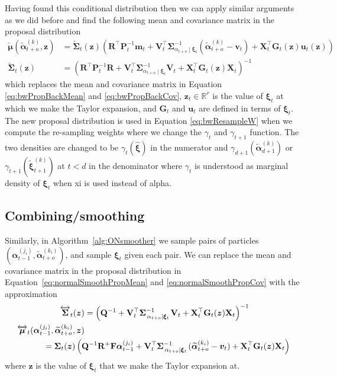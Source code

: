 \documentclass[notitlepage]{article}
\renewcommand{\vec}[1]{\bm{#1}}
\newcommand{\vecLarrow}[1]{\overleftarrow{\vec{#1}}}
\newcommand{\vecLRarrow}[1]{\overleftrightarrow{\vec{#1}}}
\newcommand{\mat}[1]{\mathbf{#1}}
\newcommand{\matLarrow}[1]{\overleftarrow{\mat{#1}}}
\newcommand{\matLRarrow}[1]{\overleftrightarrow{\mat{#1}}}
\newcommand{\Lparen}[1]{\left( #1\right)}
\newcommand\subCond[3]{#1_{\left. #2 \middle\vert #3\right.}}
\newcommand{\partic}[3]{#1_{#2}^{\Lparen{#3}}}
\newcommand{\particB}[3]{\widetilde{#1}_{#2}^{\Lparen{#3}}}
\newcommand{\dimRng}{r}
\newcommand{\nPeriods}{d}
\begin{document}
Having found this conditional distribution then we can apply similar arguments as we did 
before and find the following mean and covariance matrix in the proposal distribution %
%
\begin{align*}
\vecLarrow\mu (\particB{\vec{\alpha}}{t + o}k, \vec z)
	&= \matLarrow\Sigma_t(\vec z)\Lparen{
	\mat R^\top\mat P_t^{-1}\vec m_t + 
	\mat V_t^\top\subCond{\mat\Sigma}{\alpha_{t + o}}{\vec\xi_t}^{-1}
	(\particB{\vec{\alpha}}{t + o}k - \vec v_t) + 
	\mat X_t^\top\mat G_t(\vec z)\vec u_t(\vec z)} \\
\matLarrow\Sigma_t(\vec z) &= 
	\Lparen{
		\mat R^\top\mat P_t^{-1} \mat R + 
		\mat V_t^\top\subCond{\mat\Sigma}{\alpha_{t + o}}{\vec\xi_t}^{-1}\mat V_t + 
		\mat X_t^\top \mat G_t(\vec z) \mat X_t}^{-1}
\end{align*} %
%
which replaces the mean and covariance matrix in Equation \eqref{eq:bwPropBackMean} and \eqref{eq:bwPropBackCov},
$\vec z_t\in\mathbb R^\dimRng$ is the value of $\vec\xi_t$ at which we make the Taylor expansion, and
$\mat G_t$ and $\vec u_t$ are defined in terms of $\vec\xi_t$. The new proposal distribution 
is used in Equation \eqref{eq:bwResampleW} when we compute the re-sampling weights where 
we change the $\gamma_t$ and $\gamma_{t+1}$ function. The two densities are changed to be 
$\gamma_t(\widehat{\vec\xi})$ in the numerator and 
$\gamma_{\nPeriods + 1}(\particB{\vec{\alpha}}{\nPeriods + 1}k)$ or 
$\gamma_{t + 1}(\particB{\vec\xi}{t + 1}k)$ at $t < \nPeriods$ in the denominator 
where $\gamma_t$ is understood as marginal density of $\vec\xi_t$ when xi is used instead 
of alpha.

\subsection{Combining/smoothing}
Similarly, in Algorithm~\ref{alg:ONsmoother} we sample pairs of particles 
$(\partic{\vec{\alpha}}{t - 1}{j_i}, \particB{\vec{\alpha}}{t + o}{k_i})$, 
and sample $\vec\xi_t$ given each pair. We can replace the mean and covariance matrix in 
the proposal distribution in Equation~\eqref{eq:normalSmoothPropMean} and 
\eqref{eq:normalSmoothPropCov} with the approximation %
%
\begin{align*}
\matLRarrow\Sigma_t(\vec z) &= \Lparen{
	\mat Q^{-1} + 
	\mat V_t^\top\subCond{\mat\Sigma}{\alpha_{t + o}}{\vec\xi_t}^{-1}\mat V_t + 
	\mat X_t^\top \mat G_t(\vec z) \mat X_t}^{-1}\\
\vecLRarrow\mu_t(\partic{\vec{\alpha}}{t - 1}{j_i}, 
	\particB{\vec{\alpha}}{t + o}{k_i}, \vec z) & \\
	&\hspace{-50pt}=
	\mat\Sigma_t(\vec z)\Lparen{
		\mat Q^{-1}\mat R^+\mat F\partic{\vec{\alpha}}{t - 1}{j_i} + 
		\mat V_t^\top\subCond{\mat\Sigma}{\alpha_{t + o}}{\vec\xi_t}^{-1}
			(\particB{\vec{\alpha}}{t + o}{k_i} - \vec v_t) + 
		\mat X_t^\top \mat G_t(\vec z) \mat X_t}
\end{align*}%
% 
where $\vec z$ is the value of $\vec\xi_t$ that we make the Taylor expansion at. 
\end{document}
